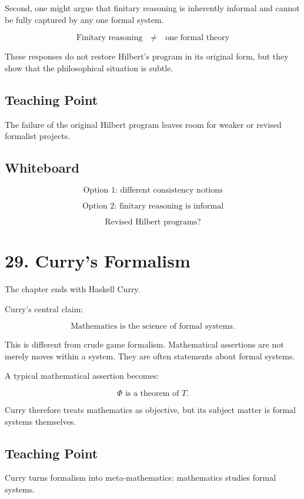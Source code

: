 \documentclass[11pt]{article}
\begin{document}
Second, one might argue that finitary reasoning is inherently informal and cannot be fully
captured by any one formal system.

\[
\text{Finitary reasoning}
\quad \neq
\quad
\text{one formal theory}
\]

These responses do not restore Hilbert's program in its original form, but they show that
the philosophical situation is subtle.

\subsection*{Teaching Point}

The failure of the original Hilbert program leaves room for weaker or revised formalist
projects.

\subsection*{Whiteboard}

\[
\text{Option 1: different consistency notions}
\]

\[
\text{Option 2: finitary reasoning is informal}
\]

\[
\text{Revised Hilbert programs?}
\]

\section*{29. Curry's Formalism}

The chapter ends with Haskell Curry.

Curry's central claim:

\[
\boxed{
\text{Mathematics is the science of formal systems.}
}
\]

This is different from crude game formalism. Mathematical assertions are not merely
moves within a system. They are often statements about formal systems.

A typical mathematical assertion becomes:

\[
\Phi \text{ is a theorem of } T.
\]

Curry therefore treats mathematics as objective, but its subject matter is formal systems
themselves.

\subsection*{Teaching Point}

Curry turns formalism into meta-mathematics: mathematics studies formal systems.
\end{document}
